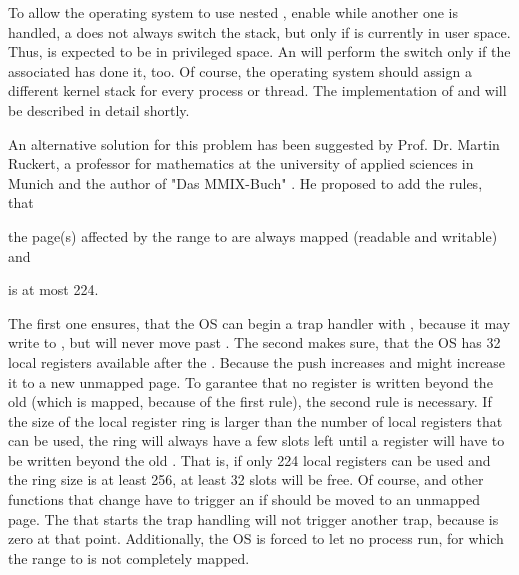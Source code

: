 To allow the operating system to use nested , \ie enable  while another one is handled, a  does not always switch the stack, but only if  is currently in user space. Thus,  is expected to be in privileged space. An  will perform the switch only if the associated  has done it, too. Of course, the operating system should assign a different kernel stack for every process or thread. The implementation of  and  will be described in detail shortly.

\medskip

An alternative solution for this problem has been suggested by Prof. Dr. Martin Ruckert, a professor for mathematics at the university of applied sciences in Munich and the author of "Das MMIX-Buch" \citep{mmix-buch}. He proposed to add the rules, that
\begin{inparaenum}
	\item the page(s) affected by the range  to  are always mapped (\ie readable and writable) and
	\item {} is at most 224.
\end{inparaenum}
The first one ensures, that the OS can begin a trap handler with , because it may write to , but will never move  past . The second makes sure, that the OS has 32 local registers available after the . Because the push increases  and might increase it to a new unmapped page. To garantee that no register is written beyond the old  (which is mapped, because of the first rule), the second rule is necessary. If the size of the local register ring is larger than the number of local registers that can be used, the ring will always have a few slots left until a register will have to be written beyond the old . That is, if only 224 local registers can be used and the ring size is at least 256, at least 32 slots will be free. Of course,  and other functions that change  have to trigger an  if  should be moved to an unmapped page. The  that starts the trap handling will not trigger another trap, because  is zero at that point. Additionally, the OS is forced to let no process run, for which the range  to  is not completely mapped.

\medskip

